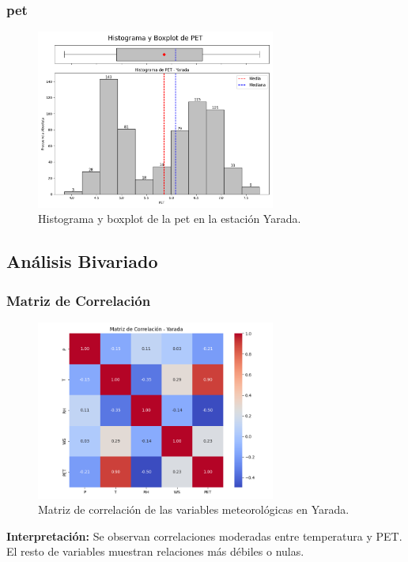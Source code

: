 \subsubsection*{\gls{pet} }
\begin{figure}[htbp]
\centering
\includegraphics[width=0.7\textwidth]{resultados/por_estacion_meteorologica/Yarada/PET_histograma.png}
\caption{Histograma y boxplot de la \gls{pet}  en la estación Yarada.}
\label{fig:yarada_PET}
\end{figure}

\subsection{Análisis Bivariado}

\subsubsection*{Matriz de Correlación}
\begin{figure}[htbp]
\centering
\includegraphics[width=0.7\textwidth]{resultados/por_estacion_meteorologica/Yarada/matriz_correlacion.png}
\caption{Matriz de correlación de las variables meteorológicas en Yarada.}
\label{fig:yarada_corr}
\end{figure}
\textbf{Interpretación:} Se observan correlaciones moderadas entre temperatura y PET. El resto de variables muestran relaciones más débiles o nulas.

